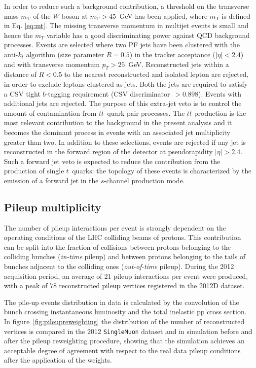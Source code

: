 In order to reduce such a background
contribution, a threshold on the transverse mass $m_{\mathrm{T}}$ of the $W$ boson
at $m_{\mathrm{T}} > 45$~GeV has been applied, where  $m_{\mathrm{T}}$ is defined
in Eq. \ref{eq:mt}. 
The missing transverse momentum in multijet events is small and hence the
$m_{T}$ variable has a good discriminating power against QCD background
processes. 
Events are selected where two PF jets have been clustered with the
anti-$k_t$ algorithm (size parameter $R = 0.5$) in the tracker acceptance
($|\eta| < 2.4$) and with transverse momentum $p_{T} > 25$~GeV.
Reconstructed jets within a distance of $R < 0.5$ to the nearest reconstructed and isolated
lepton are rejected, in order to exclude leptons clustered as jets.
Both the jets are required to satisfy a CSV tight $b$-tagging requirement
(CSV discriminator~$> 0.898$).
Events with additional jets are rejected. The purpose of this extra-jet veto
is to control the amount of contamination from $t\bar{t}$~quark pair processes.
The $t\bar{t}$ production is the most relevant contribution to the background
in the present analysis and it becomes the dominant process in events with an
associated jet multiplicity greater than two.
In addition to these selections, events are rejected if any jet is
reconstructed in the forward region of the detector at pseudorapidity
$|\eta| > 2.4$. Such a forward jet veto is expected to reduce the contribution
from the production of single $t$~quarks: the topology of these events is
characterized by the emission of a forward jet in the $s$-channel production mode.

\subsection{Pileup multiplicity}
\label{sec:pileupreweight}

The number of pileup interactions
per event is strongly dependent on the operating
conditions of the LHC colliding beams of protons.
This contribution can be split into the fraction of collisions
between protons belonging to the colliding bunches (\textit{in-time}
pileup) and between protons belonging to the tails of bunches adjacent
to the colliding ones (\textit{out-of-time} pileup).
During the 2012 acquisition period, an average of $21$ pileup interactions per
event were produced, with a peak of $78$ reconstructed pileup vertices
registered in the 2012D dataset.

The pile-up events distribution in data is calculated by the convolution of the
bunch crossing instantaneous luminosity and the total inelastic pp cross section.
In figure~\ref{fig:pileupreweighting} the distribution of the number of
reconstructed vertices is compared
in the 2012 \texttt{SingleMuon} dataset and in simulation before and after the
pileup reweighting procedure, showing that the simulation achieves an acceptable degree
of agreement with respect to the real data pileup conditions after the
application of the weights.

